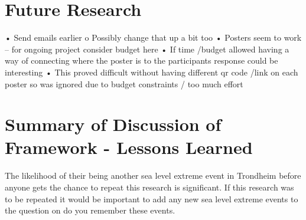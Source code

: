 \section{Future Research}
•	Send emails earlier
o	Possibly change that up a bit too
•	Posters seem to work – for ongoing project consider budget here
•	If time /budget allowed having a way of connecting where the poster is to the participants response could be interesting
•	This proved difficult without having different qr code /link on each poster so was ignored due to budget constraints / too much effort

\section{Summary of Discussion of Framework - Lessons Learned}


The likelihood of their being another sea level extreme event in Trondheim before anyone gets the chance to repeat this research is significant. If this research was to be repeated it would be important to add any new sea level extreme events to the question on do you remember these events. 